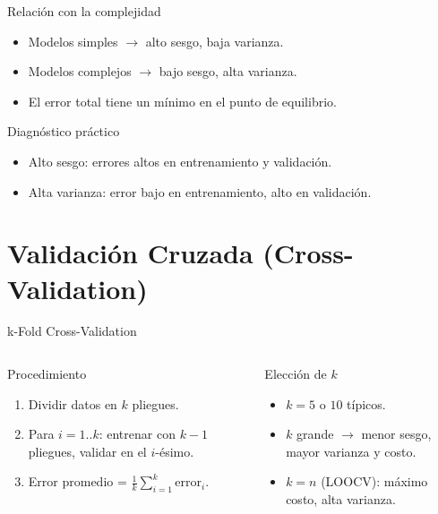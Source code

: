 \documentclass[aspectratio=169, 10pt, xcolor=table]{beamer}
\begin{document}
\begin{frame}{Relación con la complejidad}
    \begin{itemize}
        \item Modelos simples $\rightarrow$ alto sesgo, baja varianza.
        \item Modelos complejos $\rightarrow$ bajo sesgo, alta varianza.
        \item El error total tiene un mínimo en el punto de equilibrio.
    \end{itemize}
    \vspace{0.5cm}
    \begin{exampleblock}{Diagnóstico práctico}
        \begin{itemize}
            \item Alto sesgo: errores altos en entrenamiento y validación.
            \item Alta varianza: error bajo en entrenamiento, alto en validación.
        \end{itemize}
    \end{exampleblock}
\end{frame}

\section{Validación Cruzada (Cross-Validation)}

\begin{frame}{k-Fold Cross-Validation}
    \begin{columns}[t]
        \begin{block}{Procedimiento}
            \begin{enumerate}
                \item Dividir datos en $k$ pliegues.
                \item Para $i=1..k$: entrenar con $k-1$ pliegues, validar en el $i$-ésimo.
                \item Error promedio = $\frac{1}{k}\sum_{i=1}^k \text{error}_i$.
            \end{enumerate}
        \end{block}
        \begin{block}{Elección de $k$}
            \begin{itemize}
                \item $k=5$ o $10$ típicos.
                \item $k$ grande $\rightarrow$ menor sesgo, mayor varianza y costo.
                \item $k=n$ (LOOCV): máximo costo, alta varianza.
            \end{itemize}
        \end{block}
    \end{columns}
\end{frame}
\end{document}
